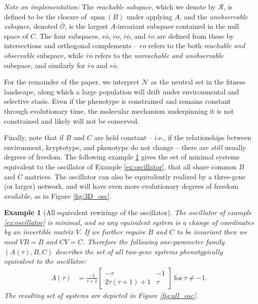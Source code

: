 \documentclass{article}
\newcommand{\ro}{{ro}}
\newcommand{\nro}{{\bar{r}o}}
\newcommand{\rno}{{r\bar{o}}}
\newcommand{\nrno}{{\bar{r}\bar{o}}}
\newcommand{\reachable}{\mathcal{R}}
\newcommand{\unobservable}{\bar{\mathcal{O}}}
\newcommand{\1}{\mathbbm{1}}
\newcommand{\Sys}{\mathcal{S}}
\newcommand{\allS}{\mathcal{N}}
\DeclareMathOperator{\spn}{span}
\newtheorem{example}{Example}
\begin{document}
\emph{Note on implementation:}
The \emph{reachable subspace},
which we denote by $\reachable$,
is defined to be the closure of $\spn(B)$ under applying $A$,
and the \emph{unobservable subspace}, 
denoted $\unobservable$, is the largest $A$-invariant subspace
contained in the null space of $C$.
The four subspaces, $\rno$, $\ro$, $\nrno$, and $\nro$
are defined from these by intersections and orthogonal complements --
$\ro$ refers to the both \emph{reachable and observable} subspace,
while $\nrno$ refers to the \emph{unreachable and unobservable} subspace,
and similarly for $\nro$ and $\rno$.


For the remainder of the paper, we interpret $\allS$ as the neutral set in the fitness landscape, 
along which a large population will drift under environmental and selective stasis. 
Even if the phenotype is constrained and remains constant through evolutionary time, 
the molecular mechanism underpinning it is not constrained and likely will not be conserved.

Finally, note that if $B$ and $C$ are held constant --
i.e., if the relationships between environment, kryptotype, and phenotype do not change --
there are \emph{still} usually degrees of freedom. 
The following example \ref{ex:all_osc} gives the set of minimal systems equivalent to the oscillator of Example \ref{ex:oscillator},
that all share common $B$ and $C$ matrices.
The oscillator can also be equivalently realized by a three-gene (or larger) network, and will have even more evolutionary degrees of freedom available, 
as in Figure \ref{fig:3D_osc}.

\begin{example}[All equivalent rewirings of the oscillator] \label{ex:all_osc}
The oscillator of example \ref{ex:oscillator} is minimal, and so any equivalent system is a change of coordinates
by an invertible matrix $V$.
If we further require $B$ and $C$ to be invariant then we need $VB=B$ and $CV=C$.
Therefore
the following one-parameter family $(A(\tau), B, C)$ describes the set of all two-gene systems
phenotypically equivalent to the oscillator:
    \begin{align*}
      A(\tau) &= \frac{-1}{\tau+1} \begin{bmatrix} -\tau & -1 \\ 2 \tau(\tau + 1) + 1 &  \tau \end{bmatrix} \ \text{for} \ \tau \neq -1 .
    \end{align*}
The resulting set of systems are depicted in Figure \ref{fig:all_osc}.
\end{example}
\end{document}
